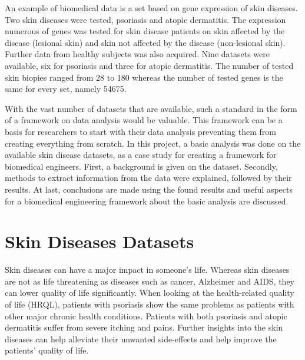 \documentclass[10pt,a4paper]{article}
\begin{document}
	An example of biomedical data is a set based on gene expression of skin diseases\cite{nair2009genome, suarez2012expanding, bigler2013cross, kim2016spectrum, yao2008type, suarez2011nonlesional, tintle2011reversal, gittler2012progressive}. Two skin diseases were tested, psoriasis and atopic dermatitis. The expression numerous of genes was tested for skin disease patients on skin affected by the disease (lesional skin) and skin not affected by the disease (non-lesional skin). Further data from healthy subjects was also acquired. Nine datasets were available, six for psoriasis\cite{nair2009genome, suarez2012expanding, bigler2013cross, kim2016spectrum, yao2008type} and three for atopic dermatitis\cite{suarez2011nonlesional, tintle2011reversal, gittler2012progressive}. The number of tested skin biopies ranged from 28 to 180 whereas the number of tested genes is the same for every set, namely 54675.

	With the vast number of datasets that are available, such a standard in the form of a framework on data analysis would be valuable. This framework can be a basis for researchers to start with their data analysis preventing them from creating everything from scratch. In this project, a basic analysis was done on the available skin disease datasets, as a case study for creating a framework for biomedical engineers. First, a background is given on the dataset. Secondly, methods to extract information from the data were explained, followed by their results. At last, conclusions are made using the found results and useful aspects for a biomedical engineering framework about the basic analysis are discussed.
	
	
	\section{Skin Diseases Datasets}
	\label{sec:SkinDiseasesDataSet}
	
	Skin diseases can have a major impact in someone's life. Whereas skin diseases are not as life threatening as diseases such as cancer, Alzheimer and AIDS, they can lower quality of life significantly. When looking at the health-related quality of life (HRQL), patients with psoriasis show the same problems as patients with other major chronic health conditions\cite{rapp1999psoriasis}. Patients with both psoriasis and atopic dermatitis suffer from severe itching and pains. Further insights into the skin diseases can help alleviate their unwanted side-effects and help improve the patients' quality of life\cite{jowett1985skin}.
	
\end{document}
